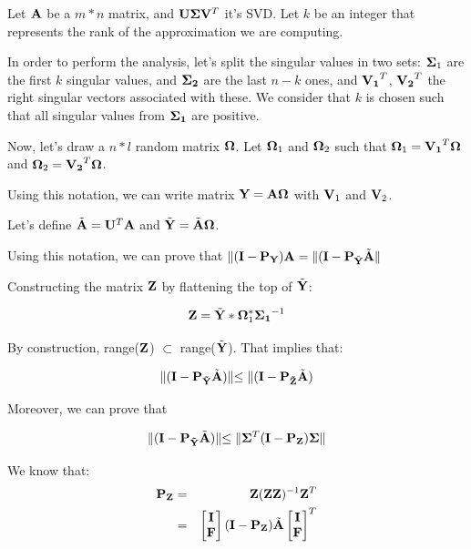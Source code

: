 \documentclass[onecolumn,12pt]{article}
\begin{document}
Let $\bold{A}$ be a $m*n$ matrix, and $\bold{U}\bold{\Sigma}\bold{V}^T$ it's
SVD. Let $k$ be an integer that represents the rank of the approximation we
are computing.

In order to perform the analysis, let's split the singular values in two sets:
$\bold{\Sigma}_1$ are the first $k$ singular values, and $\bold{\Sigma_2}$ are
the last $n - k$ ones, and $\bold{V_1}^T$, $\bold{V_2}^T$ the right singular
vectors associated with these. We consider that $k$ is chosen such that all
singular values from $\bold{\Sigma_1}$ are positive.

Now, let's draw a $n*l$ random matrix $\bold{\Omega}$. Let $\bold{\Omega}_1$
and $\bold{\Omega}_2$ such that $\bold{\Omega}_1 = \bold{V_1}^T \bold{\Omega}$
and $\bold{\Omega}_2 = \bold{V_2}^T \bold{\Omega}$.

Using this notation, we can write matrix $\bold{Y} = \bold{A\Omega}$ with
$\bold{V}_1$ and $\bold{V}_2$.

Let's define $\tilde{\bold{A}} = \bold{U}^T \bold{A}$ and $\tilde{\bold{Y}} =
\tilde{\bold{A}} \bold{\Omega}$.

Using this notation, we can prove that $\lVert (\bold{I} - \bold{P_Y}
)\bold{A} = \lVert (\bold{I} - \bold{P}_{\tilde{\bold{Y}}} \tilde{\bold{A}}\lVert$

Constructing the matrix $\bold{Z}$ by flattening the top of
$\tilde{\bold{Y}}$:

\begin{equation}
\bold{Z} = \tilde{\bold{Y}} * \bold{\Omega}_1^* \bold{\Sigma_1}^{-1}
\end{equation}

By construction, range($\bold{Z}$) $\subset$ range($\tilde{\bold{Y}}$). That
implies that:

\begin{equation}
\lVert (\bold{I} - \bold{P_{\tilde{Y}}} \tilde{\bold{A}}) \lVert \leq
\lVert (\bold{I} - \bold{P_{\tilde{Z}}} \tilde{\bold{A}})
\end{equation}

Moreover, we can prove that

\begin{equation}
\lVert (\bold{I} - \bold{P_{\tilde{Y}}} \tilde{\bold{A}}) \lVert \leq
\lVert \bold{\Sigma}^T (\bold{I} - \bold{P_Z}) \bold{\Sigma}\lVert
\end{equation}

We know that:
\begin{align}
\bold{P_Z} & = & \bold{Z} (\bold{Z} \bold{Z})^{-1} \bold{Z}^T \\
	   & = &
	   \begin{bmatrix}
	   \bold{I} \\
	   \bold{F}
	   \end{bmatrix} (\bold{I} - \bold{P_Z}) \tilde{\bold{A}}
	   \begin{bmatrix}
	   \bold{I} \\
	   \bold{F}
	   \end{bmatrix}^T
\end{align}
\end{document}
